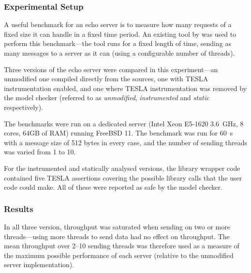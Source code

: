 \subsubsection{Experimental Setup}

A useful benchmark for an echo server is to measure how many requests of a fixed
size it can handle in a fixed time period. An existing tool by
\textcite{hoyer_rust_2016} was used to perform this benchmark---the tool runs
for a fixed length of time, sending as many messages to a server as it can
(using a configurable number of threads).

Three versions of the echo server were compared in this experiment---an
unmodified one compiled directly from the \lwip{} sources, one with TESLA
instrumentation enabled, and one where TESLA instrumentation was removed by the
model checker (referred to as \emph{unmodified}, \emph{instrumented} and
\emph{static} respectively).

The benchmarks were run on a dedicated server (Intel Xeon E5-1620
\SI{3.6}{\GHz}, 8 cores, 64GB of RAM) running FreeBSD 11. The benchmark was run
for \SI{60}{\s} with a message size of 512 bytes in every case, and the number
of sending threads was varied from 1 to 10.

For the instrumented and statically analysed versions, the library wrapper code
contained five TESLA assertions covering the possible library calls that the
user code could make. All of these were reported as safe by the model checker.

\subsubsection{Results}

In all three version, throughput was saturated when sending on two or more
threads---using more threads to send data had no effect on throughput. The mean
throughput over 2--10 sending threads was therefore used as a measure of the
maximum possible performance of each server (relative to the unmodified server
implementation). 

